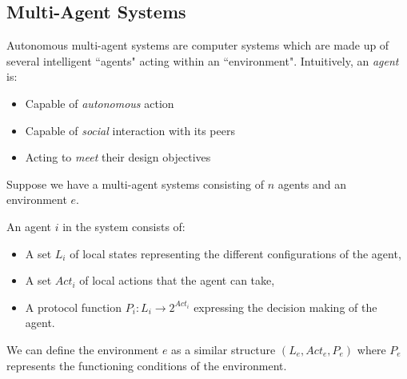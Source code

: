 \documentclass[11pt]{report}
\newenvironment{definition}[1][Definition]{\begin{trivlist}
\item[\hskip \labelsep {\bfseries #1}]}{\end{trivlist}}
\begin{document}
\subsection{Multi-Agent Systems}

Autonomous multi-agent systems are computer systems which are made up of several intelligent ``agents" acting within an ``environment". 
Intuitively, an \textit{agent} is: 
\begin{itemize}
\item Capable of \textit{autonomous} action 
\item Capable of \textit{social} interaction with its peers
\item Acting to \textit{meet} their design objectives 
\end{itemize}
 
Suppose we have a multi-agent systems consisting of $n$ agents and an environment $e$.
\begin{definition} 
An agent $i$ in the system consists of: 
\begin{itemize}
\item A set $L_i$ of local states representing the different configurations of the agent,
\item A set $Act_i$ of local actions that the agent can take,
\item A protocol function $P_i : L_i \rightarrow 2^{Act_i} $ expressing the decision making of the agent.
\end{itemize} 
\end{definition}

We can define the environment $e$ as a similar structure $(L_e, Act_e, P_e)$ where $P_e$ represents the functioning conditions of the environment. 
\end{document}
